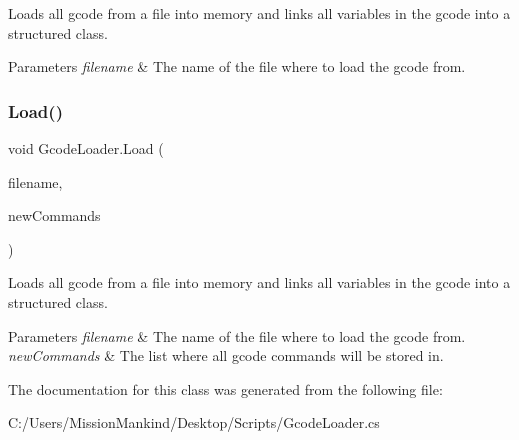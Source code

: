 Loads all gcode from a file into memory and links all variables in the gcode into a structured class. 


\begin{DoxyParams}{Parameters}
{\em filename} & The name of the file where to load the gcode from.\\
\hline
\end{DoxyParams}
\mbox{\label{class_gcode_loader_a4022243922bb02571c83a4f0897bc45f}} 
\subsubsection{\texorpdfstring{Load()}{Load()}\hspace{0.1cm}{\footnotesize\ttfamily [2/2]}}
{\footnotesize\ttfamily void Gcode\+Loader.\+Load (\begin{DoxyParamCaption}\item[{string}]{filename,  }\item[{List$<$ \hyperlink{class_gcode_command}{Gcode\+Command} $>$}]{new\+Commands }\end{DoxyParamCaption})\hspace{0.3cm}{\ttfamily [private]}}



Loads all gcode from a file into memory and links all variables in the gcode into a structured class. 


\begin{DoxyParams}{Parameters}
{\em filename} & The name of the file where to load the gcode from.\\
\hline
{\em new\+Commands} & The list where all gcode commands will be stored in.\\
\hline
\end{DoxyParams}


The documentation for this class was generated from the following file\+:\begin{DoxyCompactItemize}
\item 
C\+:/\+Users/\+Mission\+Mankind/\+Desktop/\+Scripts/Gcode\+Loader.\+cs\end{DoxyCompactItemize}
